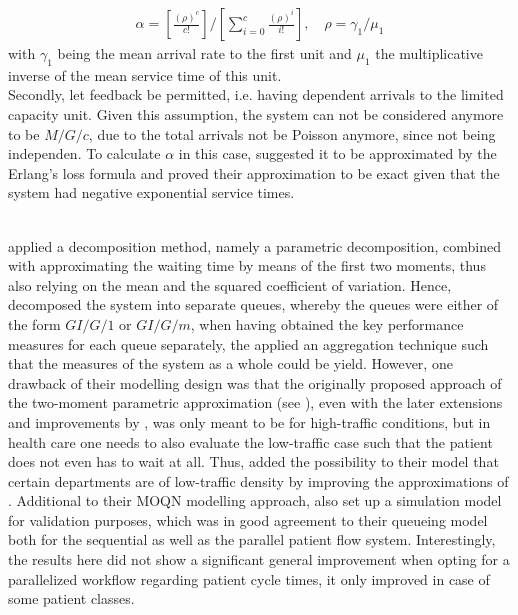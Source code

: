 \documentclass[11pt,a4paper]{article}
\begin{document}
\begin{spacing}{1.8}
\begin{align} \alpha = \left[\frac{( \rho) ^{c}}{c!}\right] \bigg/ \left[\sum_{i=0}^{c} \frac{( \rho) ^{i}}{i!}\right], \quad \rho = \gamma_1 / \mu_1 \end{align}
with \(\gamma_1\) being the mean arrival rate to the first unit and \( \mu_1 \) the multiplicative inverse of the mean service time of this unit. \\ Secondly, let feedback be permitted, i.e. having dependent arrivals to the limited capacity unit. Given this assumption, the system can not be considered anymore to be \(M/G/c\), due to the total arrivals not be Poisson anymore, since not being independen.
To calculate \(\alpha\) in this case,  \citet{Hershey1981} suggested it to be approximated by the Erlang's loss formula and proved their approximation to be exact given that the system had negative exponential service times. 

\\

 \citet{Jiang2007}  applied a decomposition method, namely a parametric decomposition, combined with approximating the waiting time by means of the first two moments, thus also relying on the mean and the squared coefficient of variation. Hence, \citep{Jiang2007} decomposed the system into separate queues, whereby the queues were either of the form \(GI/G/1\) or \(GI/G/m\), when having obtained the key performance measures for each queue separately, the applied an aggregation technique such that the measures of the system as a whole could be yield.
However, one drawback of their modelling design was that the originally proposed approach of the two-moment parametric approximation (see \citep{Reiser1975}), even with the later extensions and improvements by \citep{Whitt1983},  \citep{Bitran2009} was only meant to be for high-traffic conditions, but in health care one needs to also evaluate the low-traffic case such that the patient does not even has to wait at all. Thus,
\citet{Jiang2007} added the possibility to their model that certain departments are of low-traffic density by improving the approximations of \citep{WHITT2009}.
Additional to their MOQN modelling approach, \citet{Jiang2007} also set up a simulation model for validation purposes, which was in good agreement to their queueing model both for the sequential as well as the parallel patient flow system.
Interestingly, the results here did not show a significant general improvement when opting for a parallelized workflow regarding  patient cycle times, it only improved in case of some patient classes. 
\\


\end{spacing}
\end{document}
